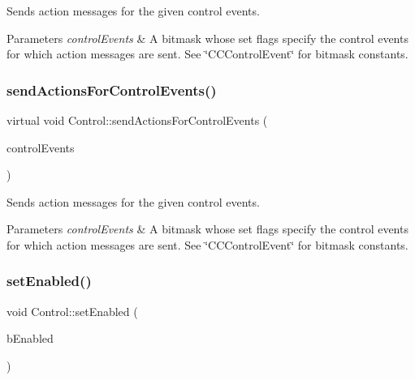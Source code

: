 Sends action messages for the given control events.


\begin{DoxyParams}{Parameters}
{\em control\+Events} & A bitmask whose set flags specify the control events for which action messages are sent. See \char`\"{}\+C\+C\+Control\+Event\char`\"{} for bitmask constants. \\
\hline
\end{DoxyParams}
\mbox{\label{classControl_a5b70b945b2bdf48f7f42d9e53a675d90}} 
\subsubsection{\texorpdfstring{send\+Actions\+For\+Control\+Events()}{sendActionsForControlEvents()}\hspace{0.1cm}{\footnotesize\ttfamily [2/2]}}
{\footnotesize\ttfamily virtual void Control\+::send\+Actions\+For\+Control\+Events (\begin{DoxyParamCaption}\item[{Event\+Type}]{control\+Events }\end{DoxyParamCaption})\hspace{0.3cm}{\ttfamily [virtual]}}

Sends action messages for the given control events.


\begin{DoxyParams}{Parameters}
{\em control\+Events} & A bitmask whose set flags specify the control events for which action messages are sent. See \char`\"{}\+C\+C\+Control\+Event\char`\"{} for bitmask constants. \\
\hline
\end{DoxyParams}
\mbox{\label{classControl_a55339ae920182245d5ec114c33f4b1fd}} 
\subsubsection{\texorpdfstring{set\+Enabled()}{setEnabled()}\hspace{0.1cm}{\footnotesize\ttfamily [1/2]}}
{\footnotesize\ttfamily void Control\+::set\+Enabled (\begin{DoxyParamCaption}\item[{bool}]{b\+Enabled }\end{DoxyParamCaption})\hspace{0.3cm}{\ttfamily [virtual]}}

